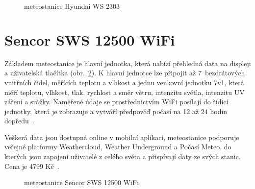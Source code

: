         \begin{figure}[htb]
        \caption{meteostanice Hyundai WS 2303~\cite{WS2303Obrazek}}
        \label{hyundaiWS}
        \end{figure}

    \section{Sencor SWS 12500 WiFi}
        Základem meteostanice je hlavní jednotka, která nabízí přehledná data na displeji a uživatelská tlačítka (obr.~\ref{sencorWS}). K hlavní jednotce lze připojit až 7~bezdrátových vnitřních čidel, měřících teplotu a vlhkost a jednu venkovní jednotku 7v1, která měří teplotu, vlhkost, tlak, rychlost a směr větru, intenzitu světla, intenzitu UV záření a srážky. Naměřené údaje se prostřednictvím WiFi posílají do řídicí jednotky, která je zobrazuje a vytváří předpověď počasí na 12 až 24 hodin dopředu~\cite{SWS12500WIFI}.
        
        Veškerá data jsou dostupná online v mobilní aplikaci, meteostanice podporuje veřejné platformy Weathercloud, Weather Underground a Počasí Meteo, do kterých jsou zapojeni uživatelé z celého světa a přispívají daty ze svých stanic. Cena je 4799 Kč~\cite{SWS12500WIFI}.
        
        \begin{figure}[htb]
        \caption{meteostanice Sencor SWS 12500 WiFi~\cite{SWS12500Obrazek}}
        \label{sencorWS}
        \end{figure}